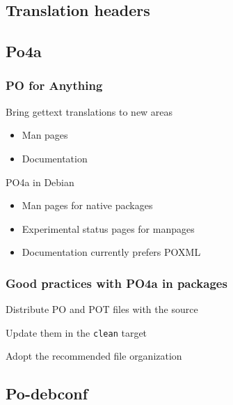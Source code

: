 \documentclass{beamer}
\begin{document}
\subsection{Translation headers}

\begin{frame}
  \frametitle{}
\end{frame}


\subsection{Po4a}

\begin{frame}
  \frametitle{PO for Anything}
	\begin{block}
		{Bring gettext translations to new areas}
		\begin{itemize}
		\item
			Man pages
		\item
			Documentation
		\end{itemize}
	\end{block}
	\begin{block}
		{PO4a in Debian}
		\begin{itemize}
		\item
			Man pages for native packages
		\item
			Experimental status pages for manpages
		\item
			Documentation currently prefers POXML
		\end{itemize}
	\end{block}
\end{frame}

\begin{frame}
  \frametitle{Good practices with PO4a in packages}
	\begin{block}
		{Distribute PO and POT files with the source}
	\end{block}
	\begin{block}
		{Update them in the \texttt{clean} target}
	\end{block}
	\begin{block}
		{Adopt the recommended file organization}
	\end{block}
\end{frame}

\subsection{Po-debconf}
\end{document}
